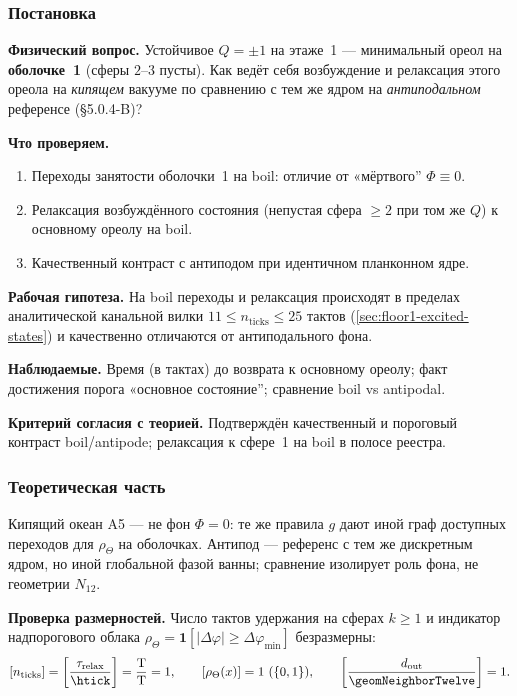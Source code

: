 \label{exp:cef03}

\subsubsection*{Постановка}
\textbf{Физический вопрос.}
Устойчивое $Q=\pm1$ на этаже~1 --- минимальный ореол на \textbf{оболочке~1} (сферы $2$--$3$ пусты).
Как ведёт себя возбуждение и релаксация этого ореола на \emph{кипящем} вакууме по сравнению с тем же ядром на \emph{антиподальном} референсе (§5.0.4-B)?

\textbf{Что проверяем.}
\begin{enumerate}[label=\textbf{(\alph*)},leftmargin=*,itemsep=0.25em]
\item Переходы занятости оболочки~1 на boil: отличие от «мёртвого'' $\Phi\equiv0$.
\item Релаксация возбуждённого состояния (непустая сфера $\ge2$ при том же $Q$) к основному ореолу на boil.
\item Качественный контраст с антиподом при идентичном планконном ядре.
\end{enumerate}

\textbf{Рабочая гипотеза.}
На boil переходы и релаксация происходят в пределах аналитической канальной вилки $11 \le n_{\mathrm{ticks}} \le 25$ тактов (\cref{sec:floor1-excited-states}) и качественно отличаются от антиподального фона.

\textbf{Наблюдаемые.}
Время (в тактах) до возврата к основному ореолу; факт достижения порога «основное состояние''; сравнение boil vs antipodal.

\textbf{Критерий согласия с теорией.}
Подтверждён качественный и пороговый контраст boil/antipode; релаксация к сфере~1 на boil в полосе реестра.

\subsubsection*{Теоретическая часть}
Кипящий океан A5 --- не фон $\Phi=0$: те же правила $g$ дают иной граф доступных переходов для $\rho_\Theta$ на оболочках.
Антипод --- референс с тем же дискретным ядром, но иной глобальной фазой ванны; сравнение изолирует роль фона, не геометрии $N_{12}$.

\textbf{Проверка размерностей.}
Число тактов удержания на сферах $k\ge 1$ и индикатор надпорогового облака $\rho_\Theta = \mathbf{1}[|\Delta\varphi|\ge\Delta\varphi_{\min}]$ безразмерны:
\[
  [n_{\mathrm{ticks}}] = \left[\frac{\tau_{\mathrm{relax}}}{\htick}\right] = \frac{\mathrm{T}}{\mathrm{T}} = 1,\qquad
  [\rho_\Theta(x)] = 1\ (\{0,1\}),\qquad
  \left[\frac{d_{\mathrm{out}}}{\geomNeighborTwelve}\right] = 1.
\]

